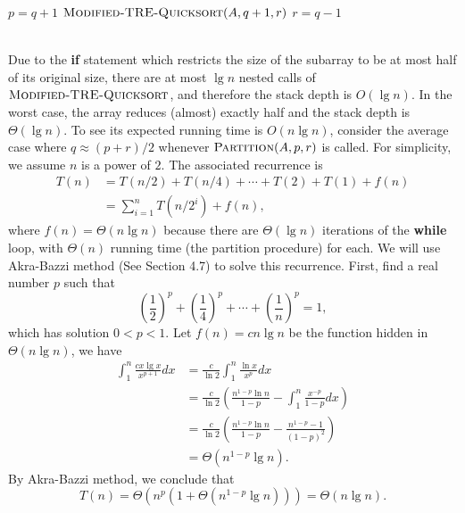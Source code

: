 \documentclass[12pt,reqno]{amsart}
\begin{document}
\begin{enumerate}[1.]
\begin{enumerate}
\begin{algorithm}
\begin{algorithmic}[1]
                    \STATE $p = q + 1$
                \ELSE
                    \STATE $\textsc{Modified-TRE-Quicksort}(A, q + 1, r)$
                    \STATE $r = q - 1$
                \ENDIF
                \ENDWHILE
        \end{algorithmic}
    \end{algorithm}
    \\Due to the \textbf{if} statement which restricts the size of the subarray to be at most half of its original size, there are at most $\lg{n}$ nested calls of $\textsc{Modified-TRE-Quicksort}$, and therefore the stack depth is $O(\lg{n})$. In the worst case, the array reduces (almost) exactly half and the stack depth is $\Theta(\lg{n})$. To see its expected running time is $O(n\lg{n})$, consider the average case where $q\approx (p + r)/2$ whenever $\textsc{Partition}(A, p, r)$ is called. For simplicity, we assume $n$ is a power of $2$. The associated recurrence is
    \begin{align*}
    T(n) &= T(n/2) + T(n/4) + \cdots + T(2) + T(1) + f(n)\\
    &= \sum_{i = 1}^{n}{T(n / 2^i)} + f(n),
    \end{align*}
    where $f(n) = \Theta(n\lg{n})$ because there are $\Theta(\lg{n})$ iterations of the \textbf{while} loop, with $\Theta(n)$ running time (the partition procedure) for each. We will use Akra-Bazzi method (See Section 4.7) to solve this recurrence. First, find a real number $p$ such that
    $$
    \left(\frac{1}{2}\right)^p + \left(\frac{1}{4}\right)^p + \cdots + \left(\frac{1}{n}\right)^p = 1,
    $$
    which has solution $0 < p < 1$. Let $f(n) = cn\lg{n}$ be the function hidden in $\Theta(n\lg{n})$, we have
    \begin{align*}
    \int_{1}^{n}{\frac{cx\lg{x}}{x^{p + 1}}}dx &= \frac{c}{\ln{2}}\int_{1}^{n}{\frac{\ln{x}}{x^{p}}}dx\\
    &= \frac{c}{\ln{2}}\left(\frac{n^{1 - p}\ln{n}}{1 - p} - \int_{1}^{n}{\frac{x^{-p}}{1 - p}}dx\right)\\
    &= \frac{c}{\ln{2}}\left(\frac{n^{1 - p}\ln{n}}{1 - p} - \frac{n^{1 - p} - 1}{(1 - p)^2}\right)\\
    &= \Theta(n^{1 - p}\lg{n}).
    \end{align*}
    By Akra-Bazzi method, we conclude that
    $$
    T(n) = \Theta\left(n^p\left(1 + \Theta(n^{1 - p}\lg{n})\right)\right) = \Theta(n\lg{n}).
    $$
\end{enumerate}




\end{enumerate}
\end{document}
